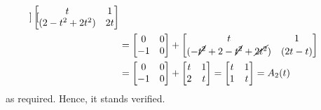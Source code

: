 \begin{align*}
\begin{bmatrix}
    \end{bmatrix}
    \begin{bmatrix}
        t                & 1  \\
        (2 - t^2 + 2t^2) & 2t
    \end{bmatrix}
    \\ & =
    \begin{bmatrix}
        0  & 0 \\
        -1 & 0
    \end{bmatrix}
    +
    \begin{bmatrix}
        t                                                  & 1        \\
        (-\cancel{t^2} + 2 - \cancel{t^2} + \cancel{2t^2}) & (2t - t)
    \end{bmatrix}
    \\ & =
    \begin{bmatrix}
        0  & 0 \\
        -1 & 0
    \end{bmatrix}
    +
    \begin{bmatrix}
        t & 1 \\
        2 & t
    \end{bmatrix}
    =
    \begin{bmatrix}
        t & 1 \\
        1 & t
    \end{bmatrix}
    =
    A_2(t)
\end{align*}
as required.
Hence, it stands verified.
